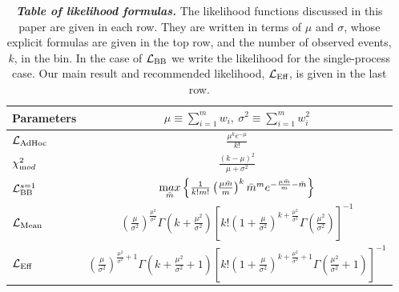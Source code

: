 \begin{table}[h!]
	\centering
	\begin{tabular}{l | c}
		\toprule
		Parameters & $\mu \equiv \sum_{i=1}^m w_i, ~ \sigma^2 \equiv \sum_{i=1}^m w_i^2$ \\
		\hline\hline
		$\mathcal{L}_{\textmd{AdHoc}}$ & $\frac{\mu^{k}e^{-\mu}}{k!}$\\ \hline
		$\chi^2_{\textrm mod}$ & $\frac{(k - \mu)^2}{\mu + \sigma^2}$ \\ \hline
		$\mathcal{L}_{\textmd{BB}}^{s=1}$ & $\underset{\bar m}{\textrm max} \left\{
		\frac{1}{k!m!} \left(\frac{\mu \bar m}{m}\right)^{k}\bar m^{m} e^{-\frac{\mu \bar m}{m} -\bar m} \right\}$ \\ \hline
		$\mathcal{L}_{\textmd{Mean}}$ & $\left(\frac{\mu}{\sigma^2}\right)^{\frac{\mu^2}{\sigma^2}}\Gamma\left(k+\frac{\mu^2}{\sigma^2}\right)\left[k!\left(1+\frac{\mu}{\sigma^2}\right)^{k+\frac{\mu^2}{\sigma^2}}\Gamma\left(\frac{\mu^2}{\sigma^2}\right)\right]^{-1}$ \\ \hline
		$\mathcal{L}_\textmd{Eff}$ & $\left(\frac{\mu}{\sigma^2}\right)^{\frac{\mu^2}{\sigma^2}+1}\Gamma\left(k+\frac{\mu^2}{\sigma^2}+1\right)\left[k!\left(1+\frac{\mu}{\sigma^2}\right)^{k+\frac{\mu^2}{\sigma^2}+1}\Gamma\left(\frac{\mu^2}{\sigma^2}+1\right)\right]^{-1}$ \\
		\bottomrule
	\end{tabular}
	\caption{\textbf{\textit{Table of likelihood formulas.}} The likelihood functions discussed in this paper are given in each row. They are written in terms of $\mu$ and $\sigma$, whose explicit formulas are given in the top row, and the number of observed events, $k$, in the bin. In the case of $\mathcal{L}_{\textmd{BB}}$ we write the likelihood for the single-process case. Our main result and recommended likelihood, $\mathcal{L}_\textmd{Eff}$, is given in the last row.}
	\label{tbl:likelihoods}
\end{table}